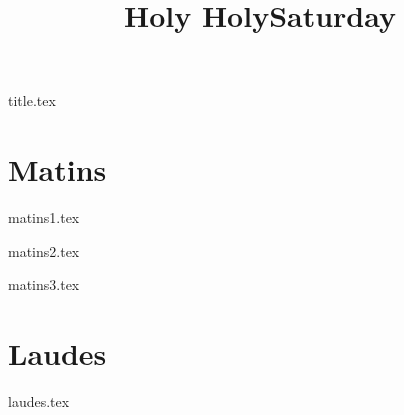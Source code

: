 \documentclass[statementpaper,10pt,openright,openbib]{memoir}
\title{Holy HolySaturday}
\begin{document}

{title.tex}

\frontmatter

\mainmatter

\chapter*{Matins}

{matins1.tex}

{matins2.tex}

{matins3.tex}

\chapter*{Laudes}

{laudes.tex}
\end{document}
